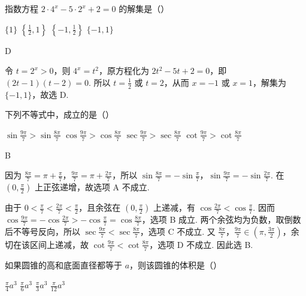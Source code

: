 \begin{problem}
指数方程 \(2\cdot4^{x}-5\cdot2^{x}+2=0\) 的解集是（\quad）

\choices
{\(\{1\}\)}
{\(\left\{\frac12,1\right\}\)}
{\(\left\{-1,\frac12\right\}\)}
{\(\{-1,1\}\)}
\end{problem}

\begin{answer}D\end{answer}

\begin{solution}
令 \(t=2^{x}>0\)，则 \(4^{x}=t^{2}\)，原方程化为 \(2t^{2}-5t+2=0\)，即 \((2t-1)(t-2)=0\). 所以 \(t=\frac12\) 或 \(t=2\)，从而 \(x=-1\) 或 \(x=1\)，解集为 \(\{-1,1\}\)，故选 D.
\end{solution}

\begin{problem}
下列不等式中，成立的是（\quad）

\choices
{\(\sin\frac{9\pi}{7}>\sin\frac{8\pi}{7}\)}
{\(\cos\frac{9\pi}{7}>\cos\frac{8\pi}{7}\)}
{\(\sec\frac{9\pi}{7}>\sec\frac{8\pi}{7}\)}
{\(\cot\frac{9\pi}{7}>\cot\frac{8\pi}{7}\)}
\end{problem}

\begin{answer}B\end{answer}

\begin{solution}
因为 \(\frac{8\pi}{7}=\pi+\frac\pi7\)，\(\frac{9\pi}{7}=\pi+\frac{2\pi}{7}\)，所以 \(\sin\frac{8\pi}{7}=-\sin\frac\pi7\)，\(\sin\frac{9\pi}{7}=-\sin\frac{2\pi}{7}\). 在 \(\left(0,\frac\pi2\right)\) 上正弦递增，故选项 A 不成立.

由于 \(0<\frac\pi7<\frac{2\pi}{7}<\frac\pi2\)，且余弦在 \(\left(0,\frac\pi2\right)\) 上递减，有 \(\cos\frac{2\pi}{7}<\cos\frac\pi7\). 因而
\(\cos\frac{9\pi}{7}=-\cos\frac{2\pi}{7}>-\cos\frac\pi7=\cos\frac{8\pi}{7}\)，选项 B 成立. 两个余弦均为负数，取倒数后不等号反向，所以 \(\sec\frac{9\pi}{7}<\sec\frac{8\pi}{7}\)，选项 C 不成立. 又 \(\frac{8\pi}{7}\)，\(\frac{9\pi}{7}\in\left(\pi,\frac{3\pi}{2}\right)\)，余切在该区间上递减，故 \(\cot\frac{9\pi}{7}<\cot\frac{8\pi}{7}\)，选项 D 不成立. 因此选 B.
\end{solution}

\begin{problem}
如果圆锥的高和底面直径都等于 \(a\)，则该圆锥的体积是（\quad）

\choices
{\(\frac{\pi}{4}a^{3}\)}
{\(\frac{\pi}{6}a^{3}\)}
{\(\frac{\pi}{3}a^{3}\)}
{\(\frac{\pi}{12}a^{3}\)}
\end{problem}

